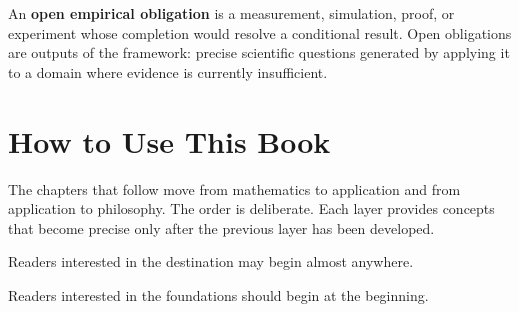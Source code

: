 An \textbf{open empirical obligation} is a measurement, simulation, proof, or experiment whose completion would resolve a conditional result. Open obligations are outputs of the framework: precise scientific questions generated by applying it to a domain where evidence is currently insufficient.

\section*{How to Use This Book}

The chapters that follow move from mathematics to application and from application to philosophy. The order is deliberate. Each layer provides concepts that become precise only after the previous layer has been developed.

Readers interested in the destination may begin almost anywhere.

Readers interested in the foundations should begin at the beginning.

